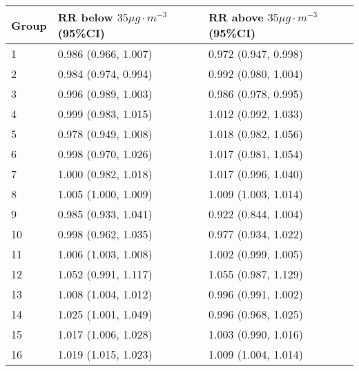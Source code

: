 \begin{tabular}{lll}
  \hline
Group & RR below $35 \mu g \cdot m^{-3}$ (95\%CI) & RR above $35 \mu g \cdot m^{-3}$ (95\%CI) \\ 
  \hline
   1 & 0.986 (0.966, 1.007) & 0.972 (0.947, 0.998) \\ 
     2 & 0.984 (0.974, 0.994) & 0.992 (0.980, 1.004) \\ 
     3 & 0.996 (0.989, 1.003) & 0.986 (0.978, 0.995) \\ 
     4 & 0.999 (0.983, 1.015) & 1.012 (0.992, 1.033) \\ 
     5 & 0.978 (0.949, 1.008) & 1.018 (0.982, 1.056) \\ 
     6 & 0.998 (0.970, 1.026) & 1.017 (0.981, 1.054) \\ 
     7 & 1.000 (0.982, 1.018) & 1.017 (0.996, 1.040) \\ 
     8 & 1.005 (1.000, 1.009) & 1.009 (1.003, 1.014) \\ 
     9 & 0.985 (0.933, 1.041) & 0.922 (0.844, 1.004) \\ 
    10 & 0.998 (0.962, 1.035) & 0.977 (0.934, 1.022) \\ 
    11 & 1.006 (1.003, 1.008) & 1.002 (0.999, 1.005) \\ 
    12 & 1.052 (0.991, 1.117) & 1.055 (0.987, 1.129) \\ 
    13 & 1.008 (1.004, 1.012) & 0.996 (0.991, 1.002) \\ 
    14 & 1.025 (1.001, 1.049) & 0.996 (0.968, 1.025) \\ 
    15 & 1.017 (1.006, 1.028) & 1.003 (0.990, 1.016) \\ 
    16 & 1.019 (1.015, 1.023) & 1.009 (1.004, 1.014) \\ 
   \hline
\end{tabular}

